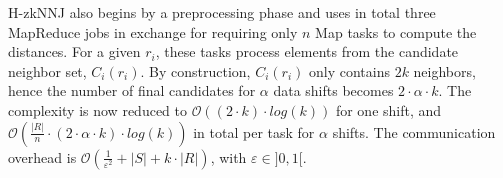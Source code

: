 H-zkNNJ\cite{Zhang:2012:EPK:2247596.2247602} also begins by a preprocessing phase and uses in total three MapReduce 
jobs in exchange for requiring only $n$ Map tasks to compute the distances. For a given $r_i$, these tasks 
process elements from the candidate neighbor set, $C_i\left(r_i\right)$. By construction, $C_i\left(r_i\right)$ only 
contains  $2k$ neighbors, hence the number of final candidates for $\alpha$ data shifts becomes $2 \cdot \alpha \cdot 
k$. The complexity is now reduced to $\mathcal{O}(\left(2 \cdot k\right) \cdot log\left(k\right))$ for one shift, 
and $\mathcal{O}(\frac{\left|R\right|}{n} \cdot \left(2 \cdot \alpha \cdot k\right) \cdot log\left(k\right))$ in total 
per task for $\alpha$ shifts. The communication overhead is 
$\mathcal{O}(\frac{1}{\varepsilon^2}+\left|S\right|+k \cdot \left|R\right|)$, with $\varepsilon \in ]0, 1[$.
%
